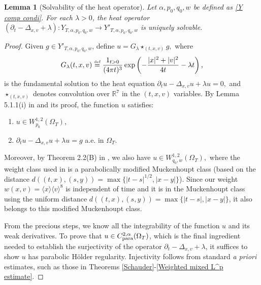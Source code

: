 \documentclass[reqno,11pt,final]{amsart}
\theoremstyle{plain}
\newtheorem{lemma}[theorem]{Lemma}
\numberwithin{equation}{section}
\numberwithin{theorem}{section}
\newcommand{\eqdef }{\overset{\mbox{\tiny{def}}}{=}}
\begin{document}
\begin{lemma}[Solvability of the heat operator]\label{Heat_solvability}Let $\alpha,p_0,q_0,w$ be defined as \eqref{Y comp condi}. For each $\lambda>0$, the heat operator $(\partial_t-\Delta_{x,v}+\lambda) : Y_{T,\alpha,p_0,q_0,w} \to Y'_{T,\alpha,p_0,q_0,w}$ is uniquely solvable.
\end{lemma}
\begin{proof}
Given $g\in Y'_{T,\alpha,p_0,q_0,w}$, define 
$
u= G_\lambda\star_{(t,x,v)}g,
$ where
\begin{align*}
G_\lambda(t,x,v) \eqdef \frac{1_{t>0}}{(4\pi t)^{3}} \exp\left(-\frac{|x|^2+|v|^2}{4t} - \lambda t\right),
\end{align*}is the fundamental solution to the heat equation 
$
\partial_tu - \Delta_{x,v}u +\lambda u=0,$ and $\star_{(t,x,v)}$ denotes convolution over $\mathbb{R}^7$ in the $(t,x,v)$ variables. By Lemma 5.1.1(i) in \cite{Ell_Krylov_2008} and its proof, the function $u$ satisfies:
\begin{enumerate}[label=(\roman*)]
\item $u\in W_{p_0}^{1,2}(\Omega_T)$,
\item $\partial_tu -\Delta_{x,v}u + \lambda u = g$ a.e. in $\Omega_T$.
\end{enumerate}Moreover, by Theorem 2.2(B) in \cite{Ell_Ping_2017}, we also have
$
u\in W_{q_0,w}^{1,2}(\Omega_T),
$ where the weight class used in \cite{Ell_Ping_2017} is a parabolically modified Muckenhoupt class (based on the distance $d((t,x), (s,y))=\max\{|t-s|^{1/2}, |x-y|\}$). Since our weight $w(x,v) = \langle x\rangle\langle v\rangle^8$ is independent of time and it is in the Muckenhoupt class using the uniform distance $d((t,x), (s,y)) = \max\{|t-s|, |x-y|\}$, it also belongs to this modified Muckenhoupt class.

From the precious steps, we know all the integrability of the function $u$ and its weak derivatives. To prove that $u\in C^{2,\alpha}_\textup{para}(\Omega_T)$, which is the final ingredient needed to establish the surjectivity of the operator $\partial_t-\Delta_{x,v} + \lambda$, it suffices to show $u$ has parabolic H\"older regularity. Injectivity follows from standard \textit{a priori} estimates, such as those in Theorems \ref{Schauder}-\ref{Weighted mixed L^p estimate}.


\end{proof}
\end{document}
